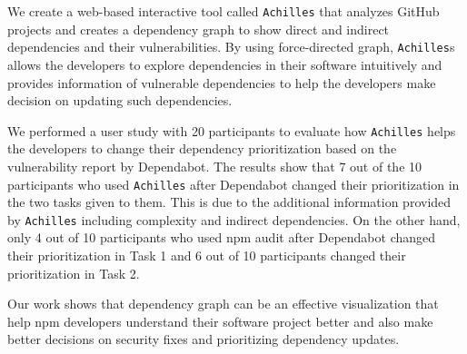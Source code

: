 \documentclass[conference]{IEEEtran}
\begin{document}
	 We create a web-based interactive tool called \texttt{Achilles} that analyzes GitHub projects and creates a dependency graph to show direct and indirect dependencies and their vulnerabilities. By using force-directed graph, \texttt{Achilles}s allows the developers to explore dependencies in their software intuitively and provides information of vulnerable dependencies to help the developers make decision on updating such dependencies. 
	
	We performed a user study with 20 participants to evaluate how \texttt{Achilles} helps the developers to change their dependency prioritization based on the vulnerability report by Dependabot. The results show that 7 out of the 10 participants who used \texttt{Achilles} after Dependabot changed their prioritization in the two tasks given to them. This is due to the additional information provided by \texttt{Achilles} including complexity and indirect dependencies. On the other hand, only 4 out of 10 participants who used npm audit after Dependabot changed their prioritization in Task 1 and 6 out of 10 participants changed their prioritization in Task 2. 
	
	Our work shows that dependency graph can be an effective visualization that help npm developers understand their software project better and also make better decisions on security fixes and prioritizing dependency updates.
	
	

\balance

	
\end{document}
